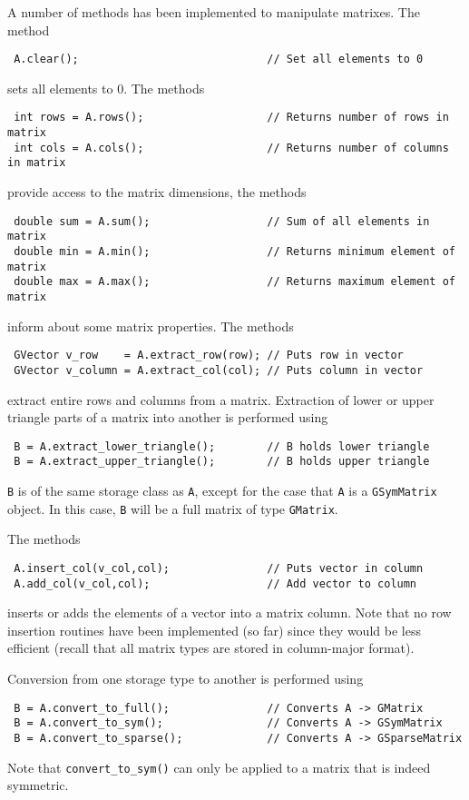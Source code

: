\documentclass{article}[12pt,a4]
\begin{document}
A number of methods has been implemented to manipulate matrixes.
The method
\begin{verbatim}
 A.clear();                             // Set all elements to 0
\end{verbatim}
sets all elements to 0.
The methods
\begin{verbatim}
 int rows = A.rows();                   // Returns number of rows in matrix
 int cols = A.cols();                   // Returns number of columns in matrix
\end{verbatim}
provide access to the matrix dimensions, the methods
\begin{verbatim}
 double sum = A.sum();                  // Sum of all elements in matrix
 double min = A.min();                  // Returns minimum element of matrix
 double max = A.max();                  // Returns maximum element of matrix
\end{verbatim}
inform about some matrix properties.
The methods
\begin{verbatim}
 GVector v_row    = A.extract_row(row); // Puts row in vector
 GVector v_column = A.extract_col(col); // Puts column in vector
\end{verbatim}
extract entire rows and columns from a matrix.
Extraction of lower or upper triangle parts of a matrix into another
is performed using
\begin{verbatim}
 B = A.extract_lower_triangle();        // B holds lower triangle
 B = A.extract_upper_triangle();        // B holds upper triangle
\end{verbatim}
{\tt B} is of the same storage class as {\tt A}, except for the case 
that {\tt A} is a {\tt GSymMatrix} object. 
In this case, {\tt B} will be a full matrix of type {\tt GMatrix}.

The methods
\begin{verbatim}
 A.insert_col(v_col,col);               // Puts vector in column
 A.add_col(v_col,col);                  // Add vector to column
\end{verbatim}
inserts or adds the elements of a vector into a matrix column.
Note that no row insertion routines have been implemented (so far) 
since they would be less efficient (recall that all matrix types are 
stored in column-major format).

Conversion from one storage type to another is performed using
\begin{verbatim}
 B = A.convert_to_full();               // Converts A -> GMatrix
 B = A.convert_to_sym();                // Converts A -> GSymMatrix
 B = A.convert_to_sparse();             // Converts A -> GSparseMatrix
\end{verbatim}
Note that {\tt convert\_to\_sym()} can only be applied to a matrix that 
is indeed symmetric.
\end{document}
